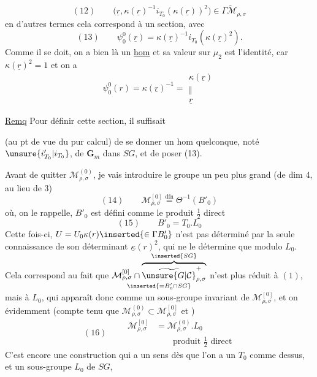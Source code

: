 \[
(12)\qquad
\bigl(\underline r,\kappa(\underline r)^{-1}i_{T_0}(\kappa(\underline r))^2\bigr)
\in\Gamma\widetilde{\mathcal M}_{\rho,\sigma}
\]
en d'autres termes cela correspond à un  section, avec
\[
(13)\qquad\psi^0_0(\underline r)=\kappa(\underline r)^{-1}i_{T_0}(\kappa(\underline r)^2).
\]
Comme il se doit, on a bien là un \uline{hom}
et sa valeur sur $\mu_2$ est l'identité,
car $\kappa(\underline r)^2=1$ et on a
\[
\psi^0_0(r)=\kappa(\underline r)^{-1}=
\begin{gathered}\kappa(\underline r)\\\Vert\\\underline r\end{gathered}
\]

\uline{Remq}\quad{}
Pour définir cette section, il suffisait



(au pt de vue du pur calcul) de se donner un hom quelconque, noté
$\unsure{i'_{T_0}|i_{T_0}}$, de $\mathbf G_m$ dans $SG$, et de poser (13).

Avant de quitter $\mathcal M_{\rho,\sigma}^{(0)}$, je vais introduire le groupe
un peu plus grand (de dim 4, au lieu de 3)
\[
(14)\qquad\mathcal M_{\rho,\sigma}^{[0]}
\overset{\mathrm{dfn}}{=}\Theta^{-1}(B'_0)
\]
où, on le rappelle, $B'_0$ est défini comme le produit $\frac12$ direct
\[
(15)\qquad B'_0=T_0.L_0
\]
Cette fois-ci, $U=U_0\kappa(r)\inserted{\in\Gamma B'_0}$ n'est pas déterminé
par la seule connaissance de son déterminant
$\underline\kappa(r)^2$, qui ne le détermine que modulo $L_0$.
Cela correspond au fait que
$\underset{\inserted{=B'_0\cap SG}}{
\mathcal M_{\rho,\sigma}^{[0]}\cap
\overbrace{\widetilde{\unsure{G|\mathcal C}}_{\rho,\sigma}^{+}}^{\inserted{SG}}}$
n'est plus réduit à $(1)$, mais à $L_0$, qui apparaît donc comme
un sous-groupe invariant de $\mathcal M_{\rho,\sigma}^{[0]}$, et on  évidemment
(compte tenu que $\mathcal M_{\rho,\sigma}^{(0)}\subset\mathcal M_{\rho,\sigma}^{[0]}$ et
) 
\[
(16)\qquad\begin{aligned}
\mathcal M_{\rho,\sigma}^{[0]}&=\mathcal M_{\rho,\sigma}^{(0)}.L_0\\
&\qquad\text{produit }\frac12\text{ direct}
\end{aligned}
\]
C'est encore une construction qui a un sens dès que l'on a un $T_0$ comme dessus,
 et un sous-groupe  $L_0$ de $SG$,

